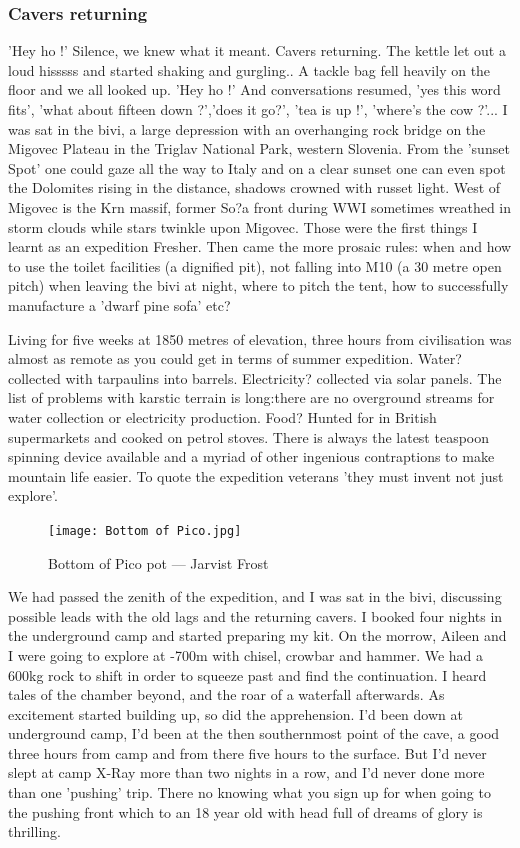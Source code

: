 \documentclass[onecolumn]{book}
\begin{document}
\subsubsection{Cavers returning}
'Hey ho !' Silence, we knew what it meant. Cavers returning. The kettle let out a loud hisssss and started shaking and gurgling.. A tackle bag fell heavily on the floor and we all looked up. 'Hey ho !' And conversations resumed, 'yes this word fits', 'what about fifteen down ?','does it go?', 'tea is up !', 'where's the cow ?'...
I was sat in the bivi, a large depression with an overhanging rock bridge on the Migovec Plateau in the Triglav National Park, western Slovenia. From the 'sunset Spot' one could gaze all the way to Italy and on a clear sunset one can even spot the Dolomites rising in the distance, shadows crowned with russet light. West of Migovec is the Krn massif, former So?a front during WWI sometimes wreathed in storm clouds while stars twinkle upon Migovec.
Those were the first things I learnt as an expedition Fresher. Then came the more prosaic rules: when and how to use the toilet facilities (a dignified pit), not falling into M10 (a 30 metre open pitch) when leaving the bivi at night, where to pitch the tent, how to successfully manufacture a 'dwarf pine sofa' etc?

Living for five weeks at 1850 metres of elevation, three hours from civilisation was almost as remote as you could get in terms of summer expedition. Water? collected with tarpaulins into barrels. Electricity? collected via solar panels. The list of problems with karstic terrain is long:there are no overground streams for water collection or electricity production. Food? Hunted for in British supermarkets and cooked on petrol stoves. There is always the latest teaspoon spinning device available and a myriad of other ingenious contraptions to make mountain life easier. To quote the expedition veterans 'they must invent not just explore'.

\begin{figure}[h!]
\centering
\texttt{[image: Bottom of Pico.jpg]}
\caption{Bottom of Pico pot --- Jarvist Frost}
\label{Pico}
\end{figure}

We had passed the zenith of the expedition, and I was sat in the bivi, discussing possible leads with the old lags and the returning cavers. I booked four nights in the underground camp and started preparing my kit. On the morrow, Aileen and I were going to explore at -700m with chisel, crowbar and hammer. We had a 600kg rock to shift in order to squeeze past and find the continuation. I heard tales of the chamber beyond, and the roar of a waterfall afterwards. As excitement started building up, so did the apprehension. I'd been down at underground camp, I'd been at the then southernmost point of the cave, a good three hours from camp and from there five hours to the surface. But I'd never slept at camp X-Ray more than two nights in a row, and I'd never done more than one 'pushing' trip. 
There no knowing what you sign up for when going to the pushing front which to an 18 year old with head full of dreams of glory is thrilling.
\end{document}
